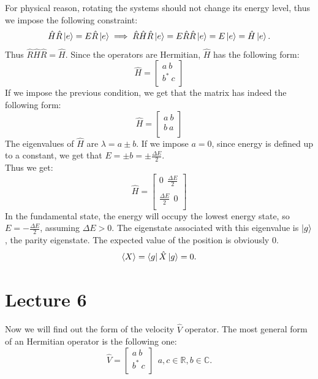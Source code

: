 \documentclass{article}
\begin{document}
For physical reason, rotating the systems should not change its energy level, thus we impose the following constraint:
$$ \hat{H}\hat{R}\ket{e} = E\hat{R}\ket{e}  \implies
\hat{R}\hat{H}\hat{R}\ket{e} = E\hat{R}\hat{R}\ket{e} = E\ket{e} = \hat{H}\ket{e}.$$
Thus $\hat{R}\hat{H}\hat{R} = \hat{H}$.
Since the operators are Hermitian, $\hat{H}$ has the following form:
$$\hat{H} = \begin{bmatrix}
    a \ b \\
    b^* \ c \\
\end{bmatrix}$$
If we impose the previous condition, we get that the matrix has indeed the following form:
$$\hat{H} = \begin{bmatrix}
    a \ b \\
    b \ a \\
\end{bmatrix}$$
The eigenvalues of $\hat{H}$ are $\lambda =  a \pm b$. If we impose $a=0$, since energy is defined up to a constant, we get that $E = \pm b = \pm \frac{\Delta E}{2}$. \\
Thus we get: $$\hat{H} = \begin{bmatrix}
    0 \ \ \frac{\Delta E}{2} \\ \\
    \frac{\Delta E}{2} \ \ 0    \\
\end{bmatrix}$$ 
In the fundamental state, the energy will occupy the lowest energy state, so $E = - \frac{\Delta E}{2}$, assuming $\Delta E > 0.$ The eigenstate associated with this eigenvalue is $\ket{g}$, the parity eigenstate.
The expected value of the position is obviously 0. 
$$ \langle X \rangle = \bra{g} \hat{X} \ket{g} = 0. $$

\section{Lecture 6}

Now we will find out the form of the velocity $\hat{V}$ operator. The most general form of an Hermitian operator is the following one:
$$\hat{V} = \begin{bmatrix}
    a \  b \\
    b^* \ c \\
\end{bmatrix} \  \ a,c \in \mathbb{R}, b \in \mathbb{C}. $$
\end{document}
